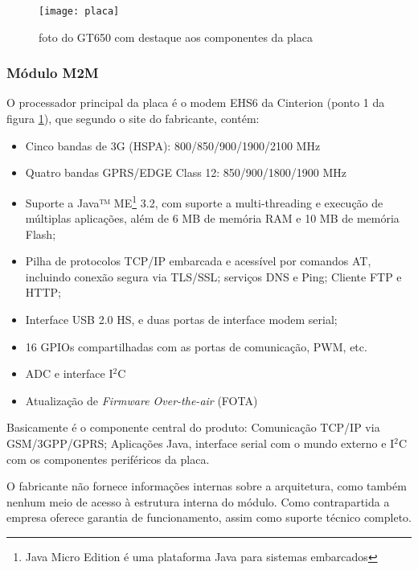         \begin{figure}
            \centering
            \texttt{[image: placa]}
            \caption{foto do GT650 com destaque aos componentes da placa}
            \label{fig:placa}
        \end{figure}
        
            \subsubsection{Módulo M2M}
                O processador principal da placa é o modem EHS6 da  Cinterion (ponto 1 da figura \ref{fig:placa}), que segundo o site do fabricante, contém: %
                
                \begin{itemize}
                    \item Cinco bandas de 3G (HSPA): 800/850/900/1900/2100 MHz
                    \item Quatro bandas GPRS/EDGE Class 12: 850/900/1800/1900 MHz
                    \item Suporte a Java™ ME\footnote{Java Micro Edition é  uma plataforma Java para sistemas embarcados} 3.2, com suporte a multi-threading e execução de múltiplas aplicações, além de 6 MB de memória RAM e 10 MB de memória Flash;  %
                    \item Pilha de protocolos TCP/IP embarcada e acessível por comandos AT, incluindo conexão segura via TLS/SSL; serviços DNS e Ping; Cliente FTP e HTTP; %
                    \item Interface USB 2.0 HS, e duas portas de interface modem serial;
                    \item 16 GPIOs compartilhadas com as portas de comunicação, PWM, etc.
                    \item ADC e interface I$^{2}$C 
                    \item Atualização de \textit{Firmware Over-the-air} (FOTA)
                \end{itemize}
                
                Basicamente é o componente central do produto: Comunicação TCP/IP via GSM/3GPP/GPRS; Aplicações Java, interface serial com o mundo externo e I$^{2}$C com os componentes periféricos da placa.
                
                O fabricante não fornece informações internas sobre a arquitetura, como também nenhum meio de acesso à estrutura interna do módulo. Como contrapartida a empresa oferece garantia de funcionamento, assim como suporte técnico completo.
                
